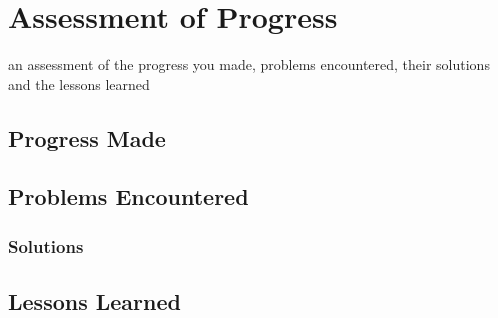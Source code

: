 \section{Assessment of Progress}\label{assessment-of-progress}

an assessment of the progress you made, problems encountered, their
solutions and the lessons learned

\subsection{Progress Made}\label{progress-made}

\subsection{Problems Encountered}\label{problems-encountered}

\subsubsection{Solutions}\label{solutions}

\subsection{Lessons Learned}\label{lessons-learned}
